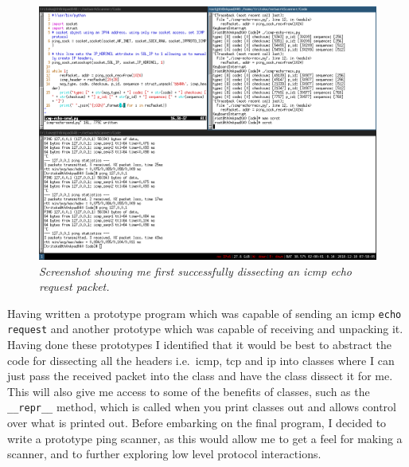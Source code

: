 \documentclass[titlepage]{article}
\begin{document}
\begin{figure}[H]
  \centering
  \includegraphics[width=\textwidth]{local_self_ping.png}
  \caption{\textit{%
    Screenshot showing me first successfully dissecting an \gls{icmp} echo request packet.
}}\label{dissectsuccess}
\end{figure}

Having written a prototype program which was capable of sending an \gls{icmp} \verb|echo request|
and another prototype which was capable of receiving and unpacking it.
Having done these prototypes I identified that it would be best to abstract the
code for dissecting all the headers i.e.\ \gls{icmp}, \gls{tcp} and \gls{ip} into classes
where I can just pass the received packet into the class and have the class dissect it for me.
This will also give me access to some of the benefits of classes, such as the \verb|__repr__| method,
which is called when you print classes out and allows control over what is printed out.
Before embarking on the final program,
I decided to write a prototype ping scanner,
as this would allow me to get a feel for making a scanner,
and to further exploring low level protocol interactions.
\end{document}
